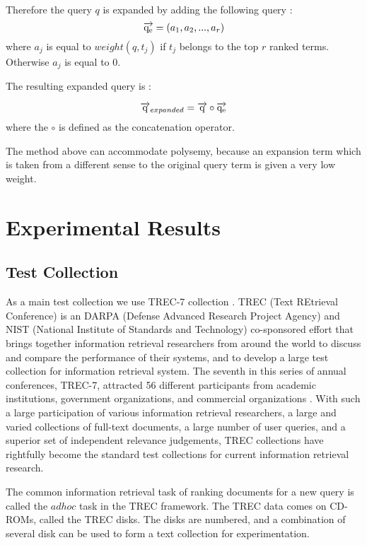 Therefore the query $q$ is expanded by adding the following query :
\[\overrightarrow{\rm q_e} = (a_1,a_2,...,a_r)\]
where $a_j$ is equal to $weight(q,t_j)$ if $t_j$ belongs to the top $r$  ranked terms. Otherwise $a_j$ is equal to 0.

The resulting expanded query is :

\[\overrightarrow{\rm q}_{expanded} = \overrightarrow{\rm q} \circ \overrightarrow{\rm q_e}\]
where the $\circ$ is defined as the concatenation operator.

The method above can accommodate polysemy, because an expansion term which is taken from a different sense to the original query term is given a very low weight.



\section{Experimental Results}
\subsection{Test Collection}
As a main test collection we use TREC-7 collection \cite{voorhees99}. 
TREC (Text REtrieval Conference) is an DARPA (Defense Advanced Research Project Agency) and NIST (National Institute of Standards and Technology) co-sponsored effort that brings together information retrieval researchers from around the world to discuss and compare the performance of their systems, and to develop a large test collection for information retrieval system. The seventh in this series of annual conferences, TREC-7, attracted 56 different participants from academic institutions, government organizations, and commercial organizations \cite{voorhees99}. With such a large participation of various information retrieval researchers, a large and varied collections of full-text documents, a large number of user queries, and a superior set of independent relevance judgements, TREC collections have rightfully become the standard test collections for current information retrieval research.

The common information retrieval task of ranking documents for a new query is called the $adhoc$ task in the TREC framework. The TREC data comes on CD-ROMs, called the TREC disks. The disks are numbered, and a combination of several disk can be used to form a text collection for experimentation.  


